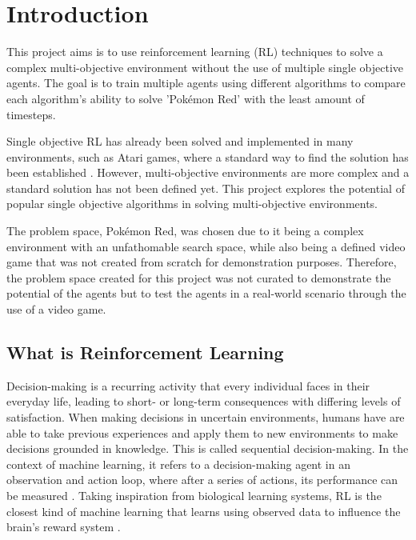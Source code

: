 \section{Introduction}

This project aims is to use reinforcement learning (RL) techniques to solve a complex multi-objective environment without the use of multiple single objective agents. The goal is to train multiple agents using different algorithms to compare each algorithm's ability to solve 'Pokémon Red' with the least amount of timesteps. 

Single objective RL has already been solved and implemented in many environments, such as Atari games, where a standard way to find the solution has been established \cite{brockman2016openai}. However, multi-objective environments are more complex and a standard solution has not been defined yet. This project explores the potential of popular single objective algorithms in solving multi-objective environments.

The problem space, Pokémon Red, was chosen due to it being a complex environment with an unfathomable search space, while also being a defined video game that was not created from scratch for demonstration purposes. Therefore, the problem space created for this project was not curated to demonstrate the potential of the agents but to test the agents in a real-world scenario through the use of a video game.

\subsection{What is Reinforcement Learning}

Decision-making is a recurring activity that every individual faces in their everyday life, leading to short- or long-term consequences with differing levels of satisfaction. When making decisions in uncertain environments, humans have are able to take previous experiences and apply them to new environments to make decisions grounded in knowledge. This is called sequential decision-making. In the context of machine learning, it refers to a decision-making agent in an observation and action loop, where after a series of actions, its performance can be measured \cite{francon2020effective}. Taking inspiration from biological learning systems, RL is the closest kind of machine learning that learns using observed data to influence the brain's reward system \cite{Sutton1}. 

